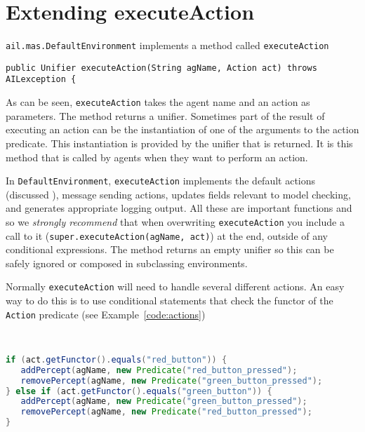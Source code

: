 \section{Extending executeAction}
\texttt{ail.mas.DefaultEnvironment} implements a method called \texttt{executeAction}

\begin{verbatim}
public Unifier executeAction(String agName, Action act) throws AILexception {
\end{verbatim}

As can be seen, \texttt{executeAction} takes the agent name and an action as parameters.  The method returns a unifier.  Sometimes part of the result of executing an action can be the instantiation of one of the arguments to the action predicate.  This instantiation is provided by the unifier that is returned.  It is this method that is called by agents when they want to perform an action.

\begin{sloppypar}
In \texttt{DefaultEnvironment}, \texttt{executeAction} implements the default actions (discussed ), message sending actions, updates fields relevant to model checking, and generates appropriate logging output.   All these are important functions and so we \emph{strongly recommend} that when overwriting \texttt{executeAction} you include a call to it (\texttt{super.executeAction(agName, act)}) at the end, outside of any conditional expressions.  The method returns an empty unifier so this can be safely ignored or composed in subclassing environments.
\end{sloppypar}

Normally \texttt{executeAction} will need to handle several different actions.  An easy way to do this is to use conditional statements that check the functor of the \texttt{Action} predicate (see Example~\ref{code:actions})

\begin{ourexample}
\label{code:actions} \quad \\
\begin{lstlisting}[basicstyle=\sffamily,language=Java,style=easslisting]
if (act.getFunctor().equals("red_button")) {
   addPercept(agName, new Predicate("red_button_pressed");
   removePercept(agName, new Predicate("green_button_pressed");
} else if (act.getFunctor().equals("green_button")) {
   addPercept(agName, new Predicate("green_button_pressed");
   removePercept(agName, new Predicate("red_button_pressed");
}
\end{lstlisting}
\end{ourexample}

